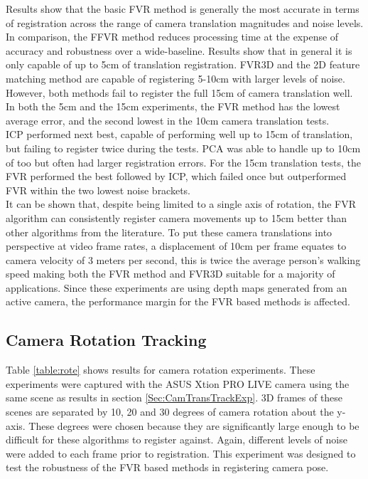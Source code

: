 Results show that the basic FVR method is generally the most accurate in terms of registration across the range of camera translation magnitudes and noise levels. In comparison, the FFVR method reduces processing time at the expense of accuracy and robustness over a wide-baseline. Results show that in general it is only capable of up to 5cm of translation registration. FVR3D and the 2D feature matching method are capable of registering 5-10cm with larger levels of noise. However, both methods fail to register the full 15cm of camera translation well. In both the 5cm and the 15cm experiments, the FVR method has the lowest average error, and the second lowest in the 10cm camera translation tests. \\

ICP performed next best, capable of performing well up to 15cm of translation, but failing to register twice during the tests. PCA was able to handle up to 10cm of too but often had larger registration errors. For the 15cm translation tests, the FVR performed the best followed by ICP, which failed once but outperformed FVR within the two lowest noise brackets. \\


It can be shown that, despite being limited to a single axis of rotation, the FVR algorithm can consistently register camera movements up to 15cm better than other algorithms from the literature. To put these camera translations into perspective at video frame rates, a displacement of 10cm per frame equates to camera velocity of 3 meters per second, this is twice the average person's walking speed making both the FVR method and FVR3D suitable for a majority of applications. Since these experiments are using depth maps generated from an active camera, the performance margin for the FVR based methods is affected. \\


\subsection{Camera Rotation Tracking}
\label{Sec:CamRoteTrackExp}

Table \ref{table:rote} shows results for camera rotation experiments. These experiments were captured with the ASUS Xtion PRO LIVE camera using the same scene as results in section \ref{Sec:CamTransTrackExp}. 3D frames of these scenes are separated by 10, 20 and 30 degrees of camera rotation about the y-axis. These degrees were chosen because they are significantly large enough to be difficult for these algorithms to register against. Again, different levels of noise were added to each frame prior to registration. This experiment was designed to test the robustness of the FVR based methods in registering camera pose. \\


